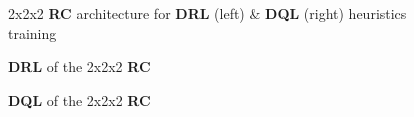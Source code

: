 \begin{figure}
  \noindent
  \caption[222RCnets]{2x2x2 \textbf{RC} architecture for \textbf{DRL} (left) \& \textbf{DQL} (right) heuristics training}
  \label{fig:222RCnets}
\end{figure}


\begin{figure}
  \noindent
  \caption[222RCDRL]{\textbf{DRL} of the 2x2x2 \textbf{RC}}
  \label{fig:222RCDRL}
\end{figure}

\begin{figure}
  \noindent
  \caption[222RCDQL]{\textbf{DQL} of the 2x2x2 \textbf{RC}}
  \label{fig:222RCDQL}
\end{figure}





